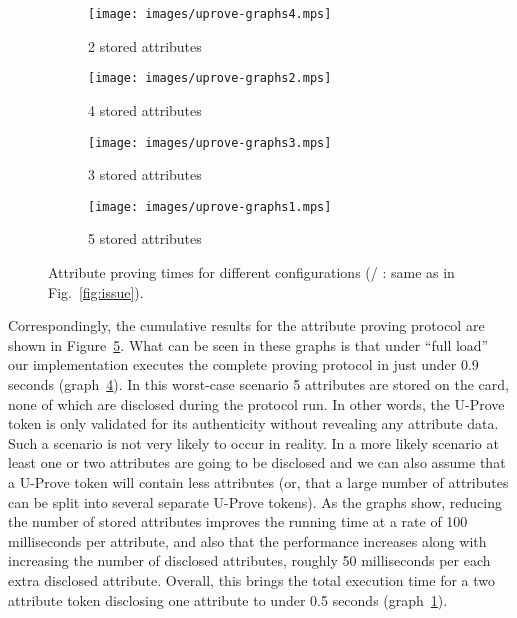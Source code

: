 \begin{figure}[ht]
  \centering
  \begin{subfigure}[b]{0.45\textwidth}
    \texttt{[image: images/uprove-graphs4.mps]}
    \caption{2 stored attributes}
    \label{fig:2attr}
  \end{subfigure}
  \begin{subfigure}[b]{0.45\textwidth}
    \texttt{[image: images/uprove-graphs2.mps]}
    \caption{4 stored attributes}
    \label{fig:4attr}
  \end{subfigure}

  \begin{subfigure}[b]{0.45\textwidth}
    \texttt{[image: images/uprove-graphs3.mps]}
    \caption{3 stored attributes}
    \label{fig:3attr}
  \end{subfigure}
  \begin{subfigure}[b]{0.45\textwidth}
    \texttt{[image: images/uprove-graphs1.mps]}
    \caption{5 stored attributes}
    \label{fig:5attr}
  \end{subfigure}

  \caption[Attribute proving times for different configurations.]{
    Attribute proving times for different configurations
    (/%
     : same as in Fig.~\ref{fig:issue}).}
  \label{fig:total}
\end{figure}

Correspondingly, the cumulative results for the attribute
proving protocol are shown in Figure~\ref{fig:total}.
What can be seen in these graphs is that under ``full load'' our
implementation executes the complete proving protocol in just under
0.9 seconds (graph~\ref{fig:5attr}). In this worst-case scenario 5 attributes are
stored on the card, none of which are disclosed during the protocol
run. In other words, the U-Prove token is only validated for its
authenticity without revealing any attribute data. Such a scenario is
not very likely to occur in reality. In a more likely scenario at
least one or two attributes are going to be disclosed and we can also
assume that a U-Prove token will contain less attributes (or,
that a large number of attributes can be split into several separate
U-Prove tokens). As the graphs show, reducing the number of stored
attributes improves the running time at a rate of 100 milliseconds per
attribute, and also that the performance increases along with
increasing the number of disclosed attributes, roughly 50 milliseconds
per each extra disclosed attribute. Overall, this brings the total
execution time for a two attribute token disclosing one attribute to under
0.5 seconds (graph~\ref{fig:2attr}).

